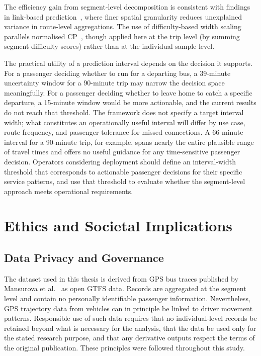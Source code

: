 \documentclass[12pt, a4paper, oneside]{report}
\begin{document}
The efficiency gain from segment-level decomposition is consistent with findings in link-based prediction~\cite{Chen201160}, where finer spatial granularity reduces unexplained variance in route-level aggregations. The use of difficulty-based width scaling parallels normalised CP~\cite{Romano2019}, though applied here at the trip level (by summing segment difficulty scores) rather than at the individual sample level.

The practical utility of a prediction interval depends on the decision it supports. For a passenger deciding whether to run for a departing bus, a 39-minute uncertainty window for a 90-minute trip may narrow the decision space meaningfully. For a passenger deciding whether to leave home to catch a specific departure, a 15-minute window would be more actionable, and the current results do not reach that threshold. The framework does not specify a target interval width; what constitutes an operationally useful interval will differ by use case, route frequency, and passenger tolerance for missed connections. A 66-minute interval for a 90-minute trip, for example, spans nearly the entire plausible range of travel times and offers no useful guidance for any time-sensitive passenger decision. Operators considering deployment should define an interval-width threshold that corresponds to actionable passenger decisions for their specific service patterns, and use that threshold to evaluate whether the segment-level approach meets operational requirements.

\section{Ethics and Societal Implications}
\label{sec:ethics}

\subsection{Data Privacy and Governance}

The dataset used in this thesis is derived from GPS bus traces published by Mansurova et al.~\cite{mansurova2025dataset} as open GTFS data. Records are aggregated at the segment level and contain no personally identifiable passenger information. Nevertheless, GPS trajectory data from vehicles can in principle be linked to driver movement patterns. Responsible use of such data requires that no individual-level records be retained beyond what is necessary for the analysis, that the data be used only for the stated research purpose, and that any derivative outputs respect the terms of the original publication. These principles were followed throughout this study.
\end{document}
